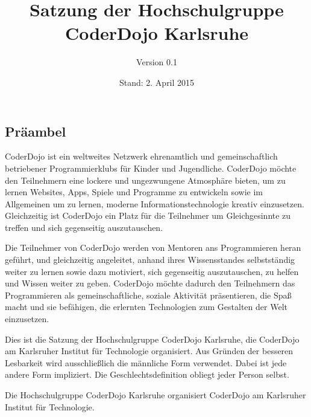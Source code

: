 \documentclass[a4paper, parskip=half, numbers=noenddot]{scrartcl}
\title{Satzung der Hochschulgruppe\\CoderDojo Karlsruhe}
\author{Version 0.1}
\date{Stand: 2. April 2015}
\begin{document}
%
%

\maketitle
\thispagestyle{empty}

\pagestyle{empty}
\newpage
\rule{0mm}{0mm}
\newpage


\begin{contract}

\setcounter{page}{1}
\pagestyle{plain}


%
%

\tableofcontents
\newpage


%
%

\section*{Präambel}

CoderDojo ist ein weltweites Netzwerk ehrenamtlich und gemeinschaftlich
betriebener Programmierklubs für Kinder und Jugendliche.
CoderDojo möchte den Teilnehmern eine lockere und ungezwungene Atmosphäre
bieten, um zu lernen Websites, Apps, Spiele und Programme zu entwickeln sowie im
Allgemeinen um zu lernen, moderne Informationstechnologie kreativ einzusetzen.
Gleichzeitig ist CoderDojo ein Platz für die Teilnehmer um Gleichgesinnte zu
treffen und sich gegenseitig auszutauschen.

Die Teilnehmer von CoderDojo werden von Mentoren ans Programmieren heran geführt,
und gleichzeitig angeleitet, anhand ihres Wissensstandes selbstständig weiter zu
lernen sowie dazu motiviert, sich gegenseitig auszutauschen, zu helfen und Wissen
weiter zu geben.
CoderDojo möchte dadurch den Teilnehmern das Programmieren als gemeinschaftliche,
soziale Aktivität präsentieren, die Spaß macht und sie befähigen, die erlernten
Technologien zum Gestalten der Welt einzusetzen.

Dies ist die Satzung der Hochschulgruppe CoderDojo Karlsruhe, die CoderDojo
am Karlsruher Institut für Technologie organisiert.
Aus Gründen der besseren Lesbarkeit wird ausschließlich die männliche Form verwendet.
Dabei ist jede andere Form impliziert.
Die Geschlechtsdefinition obliegt jeder Person selbst.


%
%


Die Hochschulgruppe CoderDojo Karlsruhe organisiert CoderDojo am Karlsruher
Institut für Technologie.


\end{contract}
\end{document}
